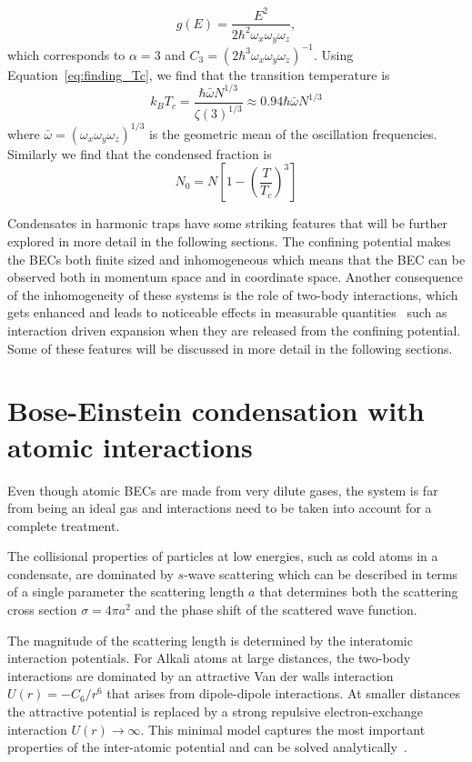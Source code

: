 \begin{equation}
	g(E)=\frac{E^2}{2\hbar^2\omega_x\omega_y\omega_z},
\end{equation}
%
which corresponds to $\alpha=3$ and $C_3=(2\hbar^3\omega_x\omega_y\omega_z)^{-1}$. Using Equation~\ref{eq:finding_Tc}, we find that the transition temperature is
%
\begin{equation}
 	k_B T_c=\frac{\hbar \bar{\omega}N^{1/3}}{\zeta(3)^{1/3}}\approx0.94\hbar\bar{\omega}N^{1/3}
 \end{equation} 
%
where $\bar{\omega}=(\omega_x\omega_y\omega_z)^{1/3}$ is the geometric mean of the oscillation frequencies. Similarly we find that the condensed fraction is
%
\begin{equation}
	N_0=N\left[1-\left(\frac{T}{T_c}\right)^3\right]
\end{equation}

Condensates in harmonic traps have some striking features that will be further explored in more detail in the following sections. The confining potential makes the BECs both finite sized and inhomogeneous which means that the BEC can be observed both in momentum space and in coordinate space. Another consequence of the inhomogeneity of these systems is the role of two-body interactions, which gets enhanced and leads to noticeable effects in measurable quantities~\cite{dalfovo_theory_1999,castin_bose-einstein_1996} such as interaction driven expansion when they are released from the confining potential. Some of these features will be discussed in more detail in the following sections.

\section{Bose-Einstein condensation with atomic interactions}

Even though atomic BECs are made from very dilute gases, the system is far from being an ideal gas and interactions need to be taken into account for a complete treatment.%

The collisional properties of particles at low energies, such as cold atoms in a condensate, are dominated by $s$-wave scattering which can be described in terms of a single parameter the scattering length $a$ that determines both the scattering cross section $\sigma=4\pi a^2$ and the phase shift of the scattered wave function. 

The magnitude of the scattering length is determined by the interatomic interaction potentials. For Alkali atoms at large distances, the two-body interactions are dominated by an attractive Van der walls interaction $U(r)=-C_6/r^6$ that arises from dipole-dipole interactions. At smaller distances the attractive potential is replaced by a strong repulsive electron-exchange interaction $U(r)\rightarrow\infty$. This minimal model captures the most important properties of the inter-atomic potential and can be solved analytically~\cite{gribakin_calculation_1993}. 

